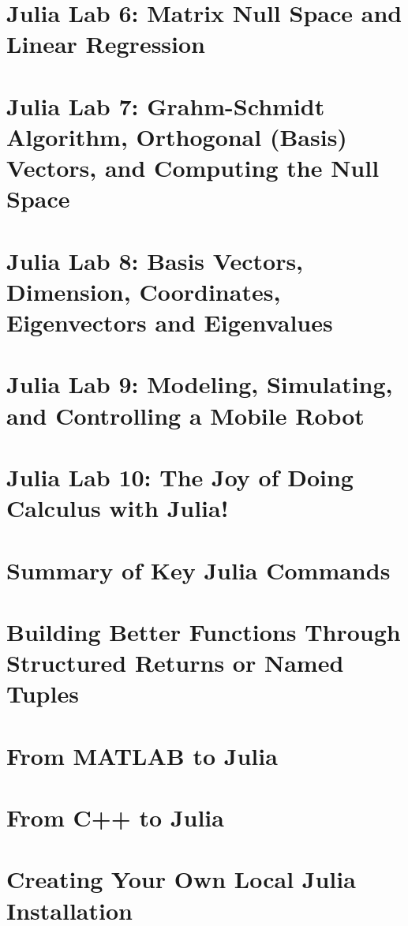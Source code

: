 \documentclass[letterpaper]{book}
\begin{document}
\chapter{Julia Lab 6: Matrix Null Space and Linear Regression}
\label{chap:Lab6}


\chapter{Julia Lab 7: Grahm-Schmidt Algorithm, Orthogonal (Basis) Vectors, and Computing the Null Space}
\label{chap:Lab7}


\chapter{Julia Lab 8: Basis Vectors, Dimension, Coordinates, Eigenvectors and Eigenvalues}
\label{chap:Lab8}


\chapter{Julia Lab 9: Modeling, Simulating, and Controlling a Mobile Robot}
\label{chap:Lab9}


\chapter{Julia Lab 10: The Joy of Doing Calculus with Julia!}
\label{chap:Lab10}


\pagestyle{plain}

\newpage

\appendix

\chapter{Summary of Key Julia Commands}
\label{App:JuliaCommands}


\chapter{Building Better Functions Through Structured Returns or Named Tuples}
\label{App:StructuredReturns}


\chapter{From MATLAB to Julia}
\label{App:FromMatlab2Julia}


\chapter{From C++ to Julia}
\label{App:FromC2Julia}


\chapter{Creating Your Own Local Julia Installation}
\label{App:MyOwnJulia}

\end{document}
